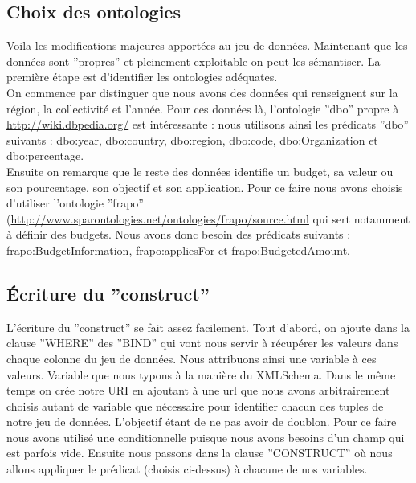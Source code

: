 \documentclass[a4paper,sffamily,12pt]{article}
\begin{document}
			\vspace{0.5cm}
		
		\subsection{Choix des ontologies}
		
			\vspace{0.5cm}
			
			Voila les modifications majeures apportées au jeu de données. Maintenant que les données sont ''propres'' et pleinement exploitable on peut les sémantiser. La première étape est d'identifier les ontologies adéquates. \\
		
			\indent On commence par distinguer que nous avons des données qui renseignent sur la région, la collectivité et l'année. Pour ces données là, l'ontologie ''dbo'' propre à \url{http://wiki.dbpedia.org/} est intéressante : nous utilisons ainsi les prédicats ''dbo'' suivants : dbo:year, dbo:country, dbo:region, dbo:code, dbo:Organization et dbo:percentage. \\ 
		
			\indent Ensuite on remarque que le reste des données identifie un budget, sa valeur ou son pourcentage, son objectif et son application. Pour ce faire nous avons choisis d'utiliser l'ontologie ''frapo'' (\url{http://www.sparontologies.net/ontologies/frapo/source.html} qui sert notamment à définir des budgets. Nous avons donc besoin des prédicats suivants : frapo:BudgetInformation, frapo:appliesFor et frapo:BudgetedAmount.
		
			\vspace{0.5cm}
			
		\subsection{Écriture du ''construct''}
			
			\vspace{0.5cm}
		
			L'écriture du ''construct'' se fait assez facilement. Tout d'abord, on ajoute dans la clause ''WHERE'' des ''BIND'' qui vont nous servir à récupérer les valeurs dans chaque colonne du jeu de données. Nous attribuons ainsi une variable à ces valeurs. Variable que nous typons à la manière du XMLSchema. Dans le même temps on crée notre URI en ajoutant à une url que nous avons arbitrairement choisis autant de variable que nécessaire pour identifier chacun des tuples de notre jeu de données. L'objectif étant de ne pas avoir de doublon. Pour ce faire nous avons utilisé une conditionnelle puisque nous avons besoins d'un champ qui est parfois vide. Ensuite nous passons dans la clause ''CONSTRUCT'' où nous allons appliquer le prédicat (choisis ci-dessus) à chacune de nos variables. \\
			
\end{document}
